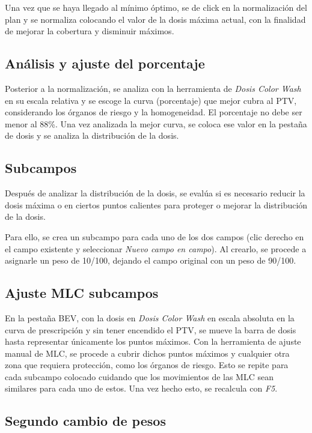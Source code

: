 \documentclass{article}
\begin{document}
Una vez que se haya llegado al mínimo óptimo, se de click en la normalización del plan y se normaliza colocando el valor de la dosis máxima actual, con la finalidad de mejorar la cobertura y disminuir máximos.

\subsection*{Análisis y ajuste del porcentaje}

Posterior a la normalización, se analiza con la herramienta de \textit{Dosis Color Wash} en su escala relativa y se escoge la curva (porcentaje) que mejor cubra al PTV, considerando los órganos de riesgo y la homogeneidad. El porcentaje no debe ser menor al 88\%. Una vez analizada la mejor curva, se coloca ese valor en la pestaña de dosis y se analiza la distribución de la dosis.

\subsection*{Subcampos}

Después de analizar la distribución de la dosis, se evalúa si es necesario reducir la dosis máxima o en ciertos puntos calientes para proteger o mejorar la distribución de la dosis.

Para ello, se crea un subcampo para cada uno de los dos campos (clic derecho en el campo existente y seleccionar \textit{Nuevo campo en campo}). Al crearlo, se procede a asignarle un peso de 10/100, dejando el campo original con un peso de 90/100.

\subsection*{Ajuste MLC subcampos}

En la pestaña BEV, con la dosis en \textit{Dosis Color Wash} en escala absoluta en la curva de prescripción y sin tener encendido el PTV, se mueve la barra de dosis hasta representar únicamente los puntos máximos. Con la herramienta de ajuste manual de MLC, se procede a cubrir dichos puntos máximos y cualquier otra zona que requiera protección, como los órganos de riesgo. Esto se repite para cada subcampo colocado cuidando que los movimientos de las MLC sean similares para cada uno de estos. Una vez hecho esto, se recalcula con \textit{F5}.

\subsection*{Segundo cambio de pesos}
\end{document}
